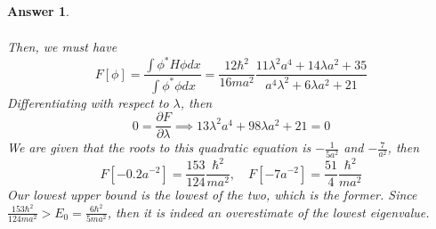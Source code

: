 \documentclass[a4paper]{article}
\newtheorem{ans}{Answer}[section]
\theoremstyle{new}
\begin{document}
\begin{ans}
\begin{enumerate}[label=(\alph*)]
\begin{eqnarray}
\end{eqnarray}
Then, we must have
$$F[\phi]=\frac{\int\phi^*H\phi dx}{\int\phi^*\phi dx}=\frac{12\hbar^2}{16ma^2}\frac{11\lambda^2a^4+14\lambda a^2+35}{a^4\lambda^2+6\lambda a^2+21}$$
Differentiating with respect to $\lambda$, then
$$0=\frac{\partial F}{\partial\lambda}\implies13\lambda^2a^4+98\lambda a^2+21=0$$
We are given that the roots to this quadratic equation is $-\frac{1}{5a^2}$ and $-\frac{7}{a^2}$, then
$$F[-0.2a^{-2}]=\frac{153}{124}\frac{\hbar^2}{ma^2},\quad F[-7a^{-2}]=\frac{51}{4}\frac{\hbar^2}{ma^2}$$
Our lowest upper bound is the lowest of the two, which is the former. Since $\frac{153\hbar^2}{124ma^2}>E_0=\frac{6\hbar^2}{5ma^2}$, then it is indeed an overestimate of the lowest eigenvalue.
\end{enumerate}
\end{ans}
\newpage
\end{document}
